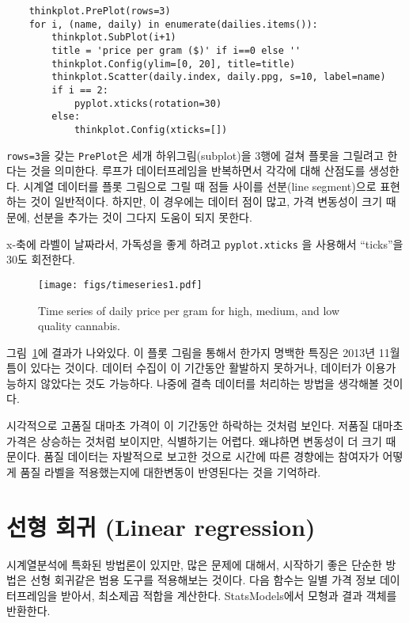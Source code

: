 \begin{verbatim}
    thinkplot.PrePlot(rows=3)
    for i, (name, daily) in enumerate(dailies.items()):
        thinkplot.SubPlot(i+1)
        title = 'price per gram ($)' if i==0 else ''
        thinkplot.Config(ylim=[0, 20], title=title)
        thinkplot.Scatter(daily.index, daily.ppg, s=10, label=name)
        if i == 2: 
            pyplot.xticks(rotation=30)
        else:
            thinkplot.Config(xticks=[])
\end{verbatim}

{\tt rows=3}을 갖는 {\tt PrePlot}은 세개 하위그림(subplot)을 3행에 걸쳐 플롯을 그릴려고 한다는 것을 의미한다.
루프가 데이터프레임을 반복하면서 각각에 대해 산점도를 생성한다.
시계열 데이터를 플롯 그림으로 그릴 때 점들 사이를 선분(line segment)으로 표현하는 것이 일반적이다. 하지만, 이 경우에는 데이터 점이 많고, 가격 변동성이 크기 때문에, 선분을 추가는 것이 그다지 도움이 되지 못한다.

x-축에 라벨이 날짜라서, 가독성을 좋게 하려고 {\tt pyplot.xticks} 을 사용해서 ``ticks''을 30도 회전한다.


\begin{figure}
\centerline{\texttt{[image: figs/timeseries1.pdf]}}
\caption{Time series of daily price per gram for high, medium, and low
quality cannabis.}
\label{timeseries1}
\end{figure}

그림~\ref{timeseries1}에 결과가 나와있다.
이 플롯 그림을 통해서 한가지 명백한 특징은 2013년 11월 틈이 있다는 것이다.
데이터 수집이 이 기간동안 활발하지 못하거나, 데이터가 이용가능하지 않았다는 것도 가능하다. 나중에 결측 데이터를 처리하는 방법을 생각해볼 것이다.

시각적으로 고품질 대마초 가격이 이 기간동안 하락하는 것처럼 보인다. 저품질 대마초 가격은 상승하는 것처럼 보이지만, 식별하기는 어렵다. 왜냐하면 변동성이 더 크기 때문이다. 품질 데이터는 자발적으로 보고한 것으로 시간에 따른 경향에는 참여자가 어떻게 품질 라벨을 적용했는지에 대한변동이 반영된다는 것을 기억하라.


\section{선형 회귀 (Linear regression)}
\label{timeregress}

시계열분석에 특화된 방법론이 있지만, 많은 문제에 대해서, 시작하기 좋은 단순한 방법은 선형 회귀같은 범용 도구를 적용해보는 것이다.
다음 함수는 일별 가격 정보 데이터프레임을 받아서, 최소제곱 적합을 계산한다. StatsModels에서 모형과 결과 객체를 반환한다.

